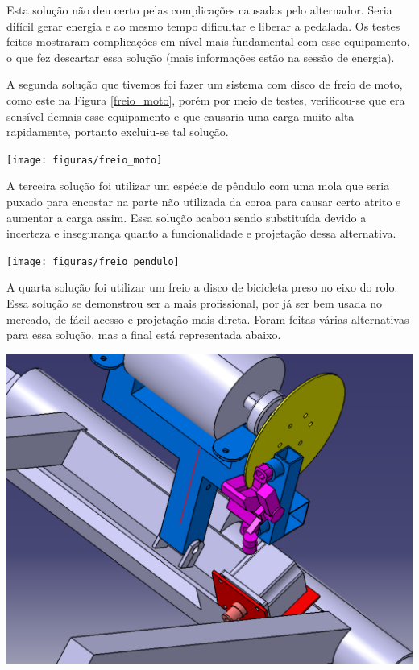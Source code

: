     Esta solução não deu certo pelas complicações causadas pelo alternador. Seria difícil gerar energia e ao mesmo tempo dificultar e liberar a pedalada. Os testes feitos mostraram complicações em nível mais fundamental com esse equipamento, o que fez descartar essa solução (mais informações estão na sessão de energia).

    A segunda solução que tivemos foi fazer um sistema com disco de freio de moto, como este na Figura \ref{freio_moto}, porém por meio de testes, verificou-se que era sensível demais esse equipamento e que causaria uma carga muito alta rapidamente, portanto excluiu-se tal solução.

    \begin{center}
    	\texttt{[image: figuras/freio\_moto]}
        \label{freio_moto}
    \end{center} 

    A terceira solução foi utilizar um espécie de pêndulo com uma mola que seria puxado para encostar na parte não utilizada da coroa para causar certo atrito e aumentar a carga assim. Essa solução acabou sendo substituída devido a incerteza e insegurança quanto a funcionalidade e projetação dessa alternativa.

    \begin{center}
    	\texttt{[image: figuras/freio\_pendulo]}
        \label{freio_pendulo}
    \end{center} 

    A quarta solução foi utilizar um freio a disco de bicicleta preso no eixo do rolo. Essa solução se demonstrou ser a mais profissional, por já ser bem usada no mercado, de fácil acesso e projetação mais direta. Foram feitas várias alternativas para essa solução, mas a final está representada abaixo.

    \begin{center}
    	\includegraphics[scale=0.5]{figuras/carga_peso}
        \label{carga_peso}
    \end{center} 
    
